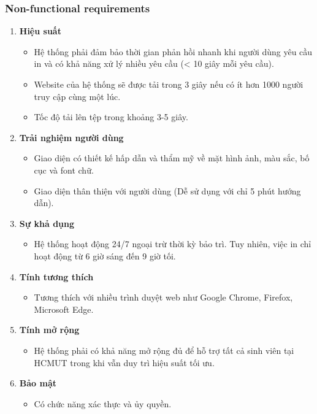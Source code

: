\documentclass[a4paper]{article}
\begin{document}
\subsubsection{Non-functional requirements}
\begin{enumerate}
    \item {\textbf{Hiệu suất}}
        \begin{itemize}
            \item Hệ thống phải đảm bảo thời gian phản hồi nhanh khi người dùng yêu cầu in và có khả năng xử lý nhiều yêu cầu (< 10 giây mỗi yêu cầu).
            \item Website của hệ thống sẽ được tải trong 3 giây nếu có ít hơn 1000 người truy cập cùng một lúc.
            \item Tốc độ tải lên tệp trong khoảng 3-5 giây.
        \end{itemize}
    \item {\textbf{Trải nghiệm người dùng}}
        \begin{itemize}
            \item Giao diện có thiết kế hấp dẫn và thẩm mỹ về mặt hình ảnh, màu sắc, bố cục và font chữ.
            \item Giao diện thân thiện với người dùng (Dễ sử dụng với chỉ 5 phút hướng dẫn).
        \end{itemize}
    \item {\textbf{Sự khả dụng}}
        \begin{itemize}
            \item Hệ thống hoạt động 24/7 ngoại trừ thời kỳ bảo trì. Tuy nhiên, việc in chỉ hoạt động từ 6 giờ sáng đến 9 giờ tối.
        \end{itemize} 
    \item {\textbf{Tính tương thích}}
        \begin{itemize}
            \item Tương thích với nhiều trình duyệt web như Google Chrome, Firefox, Microsoft Edge.
        \end{itemize}
    \item {\textbf{Tính mở rộng}}
        \begin{itemize}
            \item Hệ thống phải có khả năng mở rộng đủ để hỗ trợ tất cả sinh viên tại HCMUT trong khi vẫn duy trì hiệu suất tối ưu.
        \end{itemize}
        \item {\textbf{Bảo mật}}
        \begin{itemize}
            \item Có chức năng xác thực và ủy quyền.
        \end{itemize}
\end{enumerate}
\newpage
\end{document}
